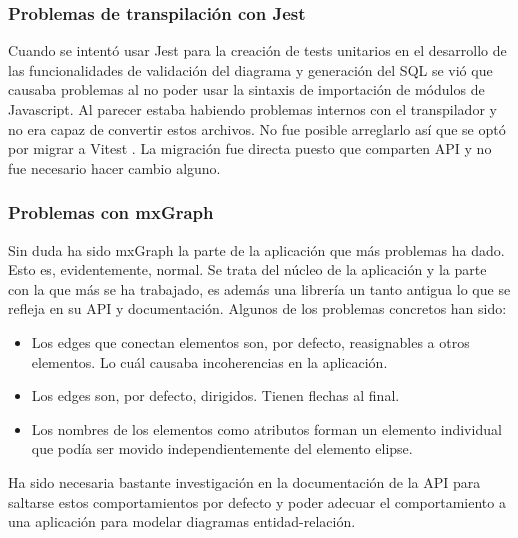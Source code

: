 \subsubsection{Problemas de transpilación con Jest}
Cuando se intentó usar Jest \cite{jest} para la creación de tests unitarios en el desarrollo de las funcionalidades de validación del diagrama y generación del SQL se vió que causaba problemas al no poder usar la sintaxis de importación de módulos de Javascript.
Al parecer estaba habiendo problemas internos con el transpilador y no era capaz de convertir estos archivos. No fue posible arreglarlo así que se optó por migrar a Vitest \cite{vitest}.
La migración fue directa puesto que comparten API y no fue necesario hacer cambio alguno.

\subsubsection{Problemas con mxGraph}
Sin duda ha sido mxGraph la parte de la aplicación que más problemas ha dado. Esto es, evidentemente, normal. Se trata del núcleo de la aplicación y la parte con la que más se ha trabajado, es además una librería un tanto antigua lo que se refleja en su API y documentación.
Algunos de los problemas concretos han sido:
\begin{itemize}\tightlist
    \item Los edges que conectan elementos son, por defecto, reasignables a otros elementos. Lo cuál causaba incoherencias en la aplicación.
    \item Los edges son, por defecto, dirigidos. Tienen flechas al final.
    \item Los nombres de los elementos como atributos forman un elemento individual que podía ser movido independientemente del elemento elipse.

\end{itemize}
Ha sido necesaria bastante investigación en la documentación de la API para saltarse estos comportamientos por defecto y poder adecuar el comportamiento a una aplicación para modelar diagramas entidad-relación.